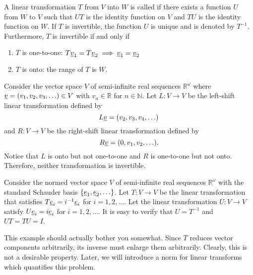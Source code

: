 \begin{definition}
A linear transformation $T$ from $V$ into $W$ is called  if there exists a function $U$ from $W$ to $V$ such that $UT$ is the identity function on $V$ and $TU$ is the identity function on $W$.
If $T$ is invertible, the function $U$ is unique and is denoted by $T^{-1}$.
Furthermore, $T$ is invertible if and only if
\begin{enumerate}
\item $T$ is one-to-one: $T \underline{v}_1 = T \underline{v}_2 \implies \underline{v}_1 = \underline{v}_2$
\item $T$ is onto: the range of $T$ is $W$.
\end{enumerate}
\end{definition}

\begin{example}
Consider the vector space $V$ of semi-infinite real sequences $\mathbb{R}^\omega$ where $\underline{v} = (v_1,v_2,v_3,\ldots)\in V$ with $v_n \in \mathbb{R}$ for $n\in \mathbb{N}$.
Let $L \colon V \rightarrow V$ be the left-shift linear transformation defined by
\[L \underline{v} = (v_2,v_3,v_4,\ldots) \]
and $R \colon V \rightarrow V$ be the right-shift linear transformation defined by
\[R \underline{v} = (0,v_1,v_2,\ldots). \]
Notice that $L$ is onto but not one-to-one and $R$ is one-to-one but not onto.
Therefore, neither transformation is invertible.
\end{example}

\begin{example}
Consider the normed vector space $V$ of semi-infinite real sequences $\mathbb{R}^\omega$ with the standard Schauder basis $\{\underline{e}_1,\underline{e}_2,\ldots\}$.
Let $T \colon V \rightarrow V$ be the linear transformation that satisfies $T \underline{e}_i = i^{-1} \underline{e}_i$ for $i=1,2,\ldots$.
Let the linear transformation $U \colon V \rightarrow V$ satisfy $U \underline{e}_i = i \underline{e}_i$ for $i=1,2,\ldots$.
It is easy to verify that $U = T^{-1}$ and $UT = TU = I$.
\end{example}
This example should actually bother you somewhat.
Since $T$ reduces vector components arbitrarily, its inverse must enlarge them arbitrarily.
Clearly, this is not a desirable property.
Later, we will introduce a norm for linear transforms which quantifies this problem.

